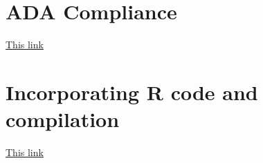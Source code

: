 \documentclass[]{article}
\begin{document}
\section{ADA Compliance}
\href{https://docs.overleaf.com/writing-and-editing/creating-accessible-pdfs}{This link}
\section{Incorporating R code and compilation}
\href{https://docs.overleaf.com/integrations-and-add-ons/r-code-knitr}{This link}
\end{document}
